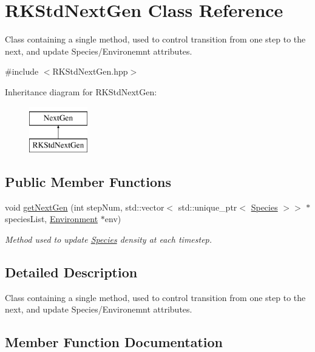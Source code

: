 \hypertarget{classRKStdNextGen}{}\section{R\+K\+Std\+Next\+Gen Class Reference}
\label{classRKStdNextGen}


Class containing a single method, used to control transition from one step to the next, and update Species/\+Environemnt attributes.  




{\ttfamily \#include $<$R\+K\+Std\+Next\+Gen.\+hpp$>$}

Inheritance diagram for R\+K\+Std\+Next\+Gen\+:\begin{figure}[H]
\begin{center}
\leavevmode
\includegraphics[height=2.000000cm]{classRKStdNextGen}
\end{center}
\end{figure}
\subsection*{Public Member Functions}
\begin{DoxyCompactItemize}
\item 
void \hyperlink{classRKStdNextGen_a6820716e3ffae252ab85591dc19ce337}{get\+Next\+Gen} (int step\+Num, std\+::vector$<$ std\+::unique\+\_\+ptr$<$ \hyperlink{classSpecies}{Species} $>$$>$ $\ast$species\+List, \hyperlink{classEnvironment}{Environment} $\ast$env)
\begin{DoxyCompactList}\small\item\em Method used to update \hyperlink{classSpecies}{Species} density at each timestep. \end{DoxyCompactList}\end{DoxyCompactItemize}


\subsection{Detailed Description}
Class containing a single method, used to control transition from one step to the next, and update Species/\+Environemnt attributes. 

\subsection{Member Function Documentation}
\mbox{\label{classRKStdNextGen_a6820716e3ffae252ab85591dc19ce337}} 
